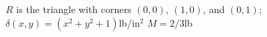 {$R$ is the triangle with corners $(0,0)$, $(1,0)$, and $(0,1)$; $\delta(x,y) = (x^2+y^2+1)$lb/in$^2$
}
{$M = 2/3$lb%
}